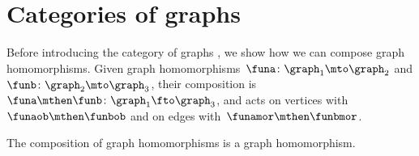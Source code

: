 
\section[Categories of graphs]{Categories of graphs}
\label{sec:cat-grph}

Before introducing the category of graphs \Grph, we show how we can compose graph homomorphisms.
Given graph homomorphisms~$\funa\colon \graph_1\mto \graph_2$ and $\funb\colon \graph_2\mto \graph_3$, their composition is $\funa\mthen \funb \colon \graph_1 \fto \graph_3$, and acts on vertices with~$\funaob \mthen \funbob$ and on edges with~$\funamor \mthen \funbmor$.

\begin{lemma}
    \label{lem:composing_homomorphisms}
    The composition of graph homomorphisms is a graph homomorphism.
\end{lemma}
%
